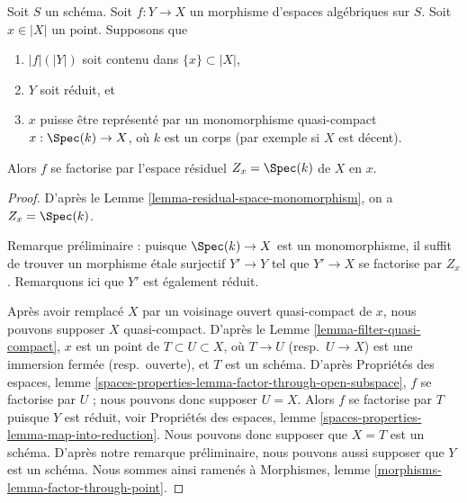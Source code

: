 \begin{lemma}
\label{lemma-factor-through-residual-space-decent}
Soit $S$ un schéma. Soit $f : Y \to X$ un morphisme d'espaces
algébriques sur $S$. Soit $x \in |X|$ un point. Supposons que
\begin{enumerate}
\item $|f|(|Y|)$ soit contenu dans $\{x\} \subset |X|$,
\item $Y$ soit réduit, et
\item $x$ puisse être représenté par un monomorphisme quasi-compact
$x : \Spec(k) \to X$, où $k$ est un corps (par exemple si $X$ est décent).
\end{enumerate}
Alors $f$ se factorise par
l'espace résiduel $Z_x = \Spec(k)$ de $X$ en $x$.
\end{lemma}

\begin{proof}
D'après le Lemme \ref{lemma-residual-space-monomorphism}, on a
$Z_x = \Spec(k)$.

\medskip\noindent
Remarque préliminaire : puisque $\Spec(k) \to X$ est un monomorphisme,
il suffit de trouver
un morphisme \'etale surjectif $Y' \to Y$ tel que $Y' \to X$
se factorise par $Z_x$. Remarquons ici que $Y'$ est également réduit.

\medskip\noindent
Après avoir remplacé $X$ par un voisinage ouvert quasi-compact de $x$,
nous pouvons supposer $X$ quasi-compact. D'après le
Lemme \ref{lemma-filter-quasi-compact}, $x$
est un point de $T \subset U \subset X$, où $T \to U$ (resp.\ $U \to X$)
est une immersion fermée (resp.\ ouverte), et $T$ est un schéma.
D'après Propriétés des espaces, lemme
\ref{spaces-properties-lemma-factor-through-open-subspace},
$f$ se factorise par $U$ ; nous pouvons donc supposer $U = X$. Alors $f$
se factorise par $T$ puisque $Y$ est réduit, voir
Propriétés des espaces, lemme \ref{spaces-properties-lemma-map-into-reduction}.
Nous pouvons donc supposer que $X = T$ est un schéma.
D'après notre remarque préliminaire, nous pouvons aussi supposer que $Y$
est un schéma. Nous sommes ainsi ramenés à Morphismes, lemme
\ref{morphisms-lemma-factor-through-point}.
\end{proof}

